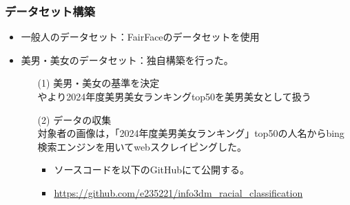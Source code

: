 \documentclass[a4paper,11pt,titlepage]{jsarticle}
\begin{document}
\subsubsection{データセット構築}
\begin{itemize}
    \item 一般人のデータセット：FairFaceのデータセットを使用
    \item 美男・美女のデータセット：独自構築を行った。
        \begin{itemize}
            \item[(1)] 美男・美女の基準を決定 \\
                \cite{bidanshi}や\cite{bijoshi}より2024年度美男美女ランキングtop50を美男美女として扱う
            \item[(2)] データの収集 \\
                対象者の画像は，「2024年度美男美女ランキング」top50の人名からbing検索エンジンを用いてwebスクレイピングした。
                \begin{itemize}
                    \item ソースコードを以下のGitHubにて公開する。
                    \item \url{https://github.com/e235221/info3dm_racial_classification}
                \end{itemize}
        \end{itemize}
\end{itemize}
    
\end{document}
